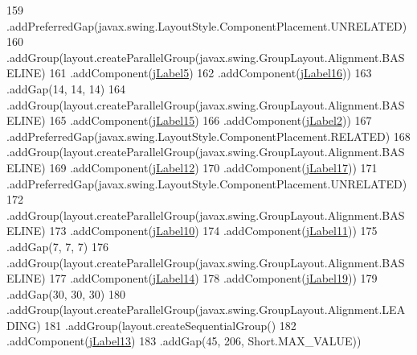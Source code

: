 \begin{DoxyCode}
159                 .addPreferredGap(javax.swing.LayoutStyle.ComponentPlacement.UNRELATED)
160                 .addGroup(layout.createParallelGroup(javax.swing.GroupLayout.Alignment.BASELINE)
161                     .addComponent(\mbox{\hyperlink{classsoftware_1_1validornotvalid_a4759a0841dcab0fa20a6e40de41546d0}{jLabel5}})
162                     .addComponent(\mbox{\hyperlink{classsoftware_1_1validornotvalid_a071acd2388aa23129a2da2e239c494d8}{jLabel16}}))
163                 .addGap(14, 14, 14)
164                 .addGroup(layout.createParallelGroup(javax.swing.GroupLayout.Alignment.BASELINE)
165                     .addComponent(\mbox{\hyperlink{classsoftware_1_1validornotvalid_aa1a81f594817fe87cc5fbbd85d33aa8a}{jLabel15}})
166                     .addComponent(\mbox{\hyperlink{classsoftware_1_1validornotvalid_a896d5beda5159ad343db01b03383b0f5}{jLabel2}}))
167                 .addPreferredGap(javax.swing.LayoutStyle.ComponentPlacement.RELATED)
168                 .addGroup(layout.createParallelGroup(javax.swing.GroupLayout.Alignment.BASELINE)
169                     .addComponent(\mbox{\hyperlink{classsoftware_1_1validornotvalid_a5a7bbbddab22b0193c6b6776c7aa5f6b}{jLabel12}})
170                     .addComponent(\mbox{\hyperlink{classsoftware_1_1validornotvalid_a5db46900582e8dd06da0cae9038921c9}{jLabel17}}))
171                 .addPreferredGap(javax.swing.LayoutStyle.ComponentPlacement.UNRELATED)
172                 .addGroup(layout.createParallelGroup(javax.swing.GroupLayout.Alignment.BASELINE)
173                     .addComponent(\mbox{\hyperlink{classsoftware_1_1validornotvalid_a2255215afcbe0670ccbeec10ca5c7aca}{jLabel10}})
174                     .addComponent(\mbox{\hyperlink{classsoftware_1_1validornotvalid_aa639ffbcb05919b5b8be27b096c874da}{jLabel11}}))
175                 .addGap(7, 7, 7)
176                 .addGroup(layout.createParallelGroup(javax.swing.GroupLayout.Alignment.BASELINE)
177                     .addComponent(\mbox{\hyperlink{classsoftware_1_1validornotvalid_a898329c2e85620214a3e83a8ec229895}{jLabel14}})
178                     .addComponent(\mbox{\hyperlink{classsoftware_1_1validornotvalid_a744ece24d9517e67e29e9c200e76b055}{jLabel19}}))
179                 .addGap(30, 30, 30)
180                 .addGroup(layout.createParallelGroup(javax.swing.GroupLayout.Alignment.LEADING)
181                     .addGroup(layout.createSequentialGroup()
182                         .addComponent(\mbox{\hyperlink{classsoftware_1_1validornotvalid_abaafc4b5c74ef3845c0469f1bf1ae5eb}{jLabel13}})
183                         .addGap(45, 206, Short.MAX\_VALUE))

\end{DoxyCode}
